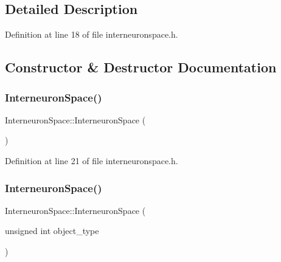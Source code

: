\subsection{Detailed Description}


Definition at line 18 of file interneuronspace.\+h.



\subsection{Constructor \& Destructor Documentation}
\mbox{\label{class_interneuron_space_a4ad439037f087e7d5cb3e1d8c581ee5f}} 
\subsubsection{\texorpdfstring{Interneuron\+Space()}{InterneuronSpace()}\hspace{0.1cm}{\footnotesize\ttfamily [1/4]}}
{\footnotesize\ttfamily Interneuron\+Space\+::\+Interneuron\+Space (\begin{DoxyParamCaption}{ }\end{DoxyParamCaption})\hspace{0.3cm}{\ttfamily [inline]}}



Definition at line 21 of file interneuronspace.\+h.

\mbox{\label{class_interneuron_space_a18d5d4920073a9a93ee3cb8f5efe9211}} 
\subsubsection{\texorpdfstring{Interneuron\+Space()}{InterneuronSpace()}\hspace{0.1cm}{\footnotesize\ttfamily [2/4]}}
{\footnotesize\ttfamily Interneuron\+Space\+::\+Interneuron\+Space (\begin{DoxyParamCaption}\item[{unsigned int}]{object\+\_\+type }\end{DoxyParamCaption})\hspace{0.3cm}{\ttfamily [inline]}}



